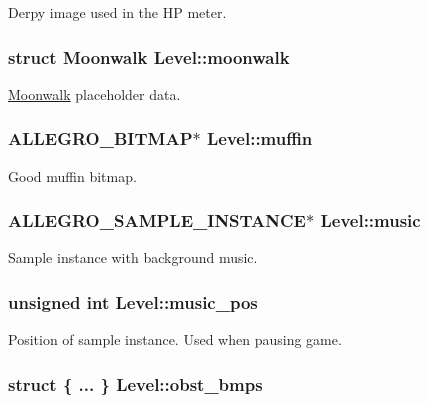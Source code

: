 \-Derpy image used in the \-H\-P meter. \hypertarget{structLevel_ab9e39b9ac0f342332e034c59d55d6a07}{
\subsubsection[{moonwalk}]{\setlength{\rightskip}{0pt plus 5cm}struct {\bf \-Moonwalk} {\bf \-Level\-::moonwalk}}}\label{structLevel_ab9e39b9ac0f342332e034c59d55d6a07}
\hyperlink{structMoonwalk}{\-Moonwalk} placeholder data. \hypertarget{structLevel_ad4d4190d232b674d4211f3355a9b7a93}{
\subsubsection[{muffin}]{\setlength{\rightskip}{0pt plus 5cm}\-A\-L\-L\-E\-G\-R\-O\-\_\-\-B\-I\-T\-M\-A\-P$\ast$ {\bf \-Level\-::muffin}}}\label{structLevel_ad4d4190d232b674d4211f3355a9b7a93}
\-Good muffin bitmap. \hypertarget{structLevel_a41c6aae8f508e078b02c291e1d6f8e67}{
\subsubsection[{music}]{\setlength{\rightskip}{0pt plus 5cm}\-A\-L\-L\-E\-G\-R\-O\-\_\-\-S\-A\-M\-P\-L\-E\-\_\-\-I\-N\-S\-T\-A\-N\-C\-E$\ast$ {\bf \-Level\-::music}}}\label{structLevel_a41c6aae8f508e078b02c291e1d6f8e67}
\-Sample instance with background music. \hypertarget{structLevel_a13e322deb3298846260af31324e5b492}{
\subsubsection[{music\-\_\-pos}]{\setlength{\rightskip}{0pt plus 5cm}unsigned int {\bf \-Level\-::music\-\_\-pos}}}\label{structLevel_a13e322deb3298846260af31324e5b492}
\-Position of sample instance. \-Used when pausing game. \hypertarget{structLevel_aeb52cb0b931eae0233dd1b50f2c02bf2}{
\subsubsection[{obst\-\_\-bmps}]{\setlength{\rightskip}{0pt plus 5cm}struct \{ ... \}   {\bf \-Level\-::obst\-\_\-bmps}}}\label{structLevel_aeb52cb0b931eae0233dd1b50f2c02bf2}
